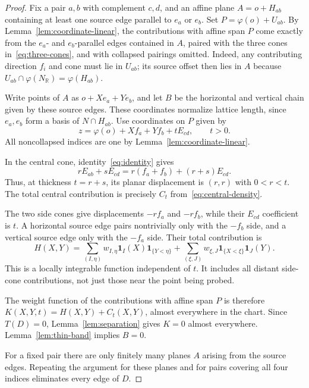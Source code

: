 \documentclass[11pt]{article}
\theoremstyle{definition}
\theoremstyle{remark}
\newcommand{\R}{\mathbb R}
\newcommand{\NR}{N_{\R}}
\newcommand{\ind}{\mathbf 1}
\begin{document}
\begin{proof}
Fix a pair $a,b$ with complement $c,d$, and an affine plane
$A=o+H_{ab}$ containing at least one source edge parallel to $e_a$
or $e_b$. Set $P=\varphi(o)+U_{ab}$. By
Lemma~\ref{lem:coordinate-linear}, the contributions with affine span
$P$ come exactly from the $e_a$- and $e_b$-parallel edges contained
in $A$, paired with the three cones in~\eqref{eq:three-cones}, and
with collapsed pairings omitted. Indeed, any contributing direction
$f_i$ and cone must lie in $U_{ab}$; its source offset then lies in
$A$ because $U_{ab}\cap\varphi(\NR)=\varphi(H_{ab})$.

Write points of $A$ as $o+Xe_a+Ye_b$, and let $B$ be the horizontal
and vertical chain given by these source edges. These coordinates
normalize lattice length, since $e_a,e_b$ form a basis of
$N\cap H_{ab}$. Use coordinates on $P$ given by
\begin{equation}\label{eq:chart}
 z=\varphi(o)+Xf_a+Yf_b+tE_{cd},\qquad t>0.
\end{equation}
All noncollapsed indices are one by
Lemma~\ref{lem:coordinate-linear}.

In the central cone, identity~\eqref{eq:identity} gives
\[
 rE_{ab}+sE_{cd}=r(f_a+f_b)+(r+s)E_{cd}.
\]
Thus, at thickness $t=r+s$, its planar displacement is $(r,r)$
with $0<r<t$. The total central contribution is precisely $C_t$
from~\eqref{eq:central-density}.

The two side cones give displacements $-r f_a$ and $-r f_b$,
while their $E_{cd}$ coefficient is $t$. A horizontal source edge
pairs nontrivially only with the $-f_b$ side, and a vertical source
edge only with the $-f_a$ side. Their total contribution is
\begin{equation}\label{eq:background}
 H(X,Y)=
 \sum_{(I,\eta)}w_{I,\eta}\ind_I(X)\ind_{\{Y<\eta\}}
 +\sum_{(\xi,J)}w_{\xi,J}\ind_{\{X<\xi\}}\ind_J(Y).
\end{equation}
This is a locally integrable function independent of $t$. It includes
all distant side-cone contributions, not just those near the point
being probed.

The weight function of the contributions with affine span $P$ is
therefore $K(X,Y,t)=H(X,Y)+C_t(X,Y)$, almost everywhere in the chart.
Since $T(D)=0$, Lemma~\ref{lem:separation} gives $K=0$ almost
everywhere. Lemma~\ref{lem:thin-band} implies $B=0$.

For a fixed pair there are only finitely many planes $A$ arising from
the source edges. Repeating the argument for these planes and for pairs
covering all four indices eliminates every edge of $D$.
\end{proof}
\end{document}
